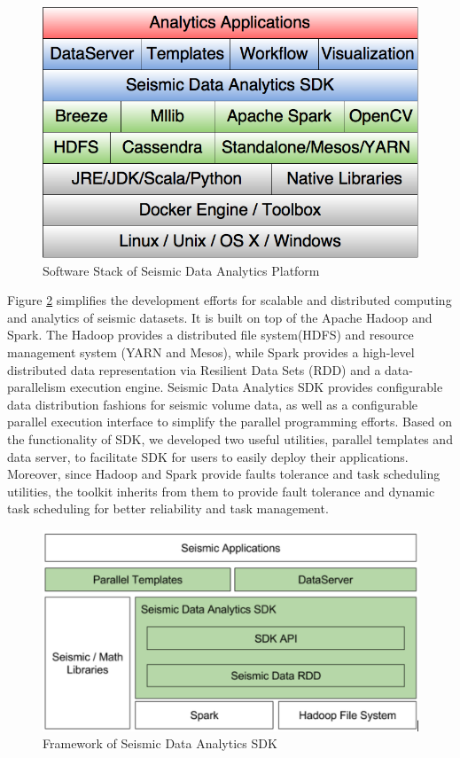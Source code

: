 \begin{figure}[h]
\centering
\includegraphics[scale=0.4]{figures/sdk_swstack.png}
\caption{Software Stack of Seismic Data Analytics Platform}
\label{sdk_swstack}
\end{figure}

Figure \ref{sdk_framework} simplifies the development efforts for scalable and distributed computing and analytics of seismic datasets. It is built on top of the Apache Hadoop and Spark. The Hadoop provides a distributed file system(HDFS) and resource management system (YARN and Mesos), while Spark provides a high-level distributed data representation via Resilient Data Sets (RDD) and a data-parallelism execution engine. Seismic Data Analytics SDK provides configurable data distribution fashions for seismic volume data, as well as a configurable parallel execution interface to simplify the parallel programming efforts. Based on the functionality of SDK, we developed two useful utilities, parallel templates and data server, to facilitate SDK for users to easily deploy their applications. Moreover, since Hadoop and Spark provide faults tolerance and task scheduling utilities, the toolkit inherits from them to provide fault tolerance and dynamic task scheduling for better reliability and task management.

\begin{figure}[h]
\centering
\includegraphics[scale=0.6]{figures/sdk_framework.png}
\caption{Framework of Seismic Data Analytics SDK}
\label{sdk_framework}
\end{figure}


